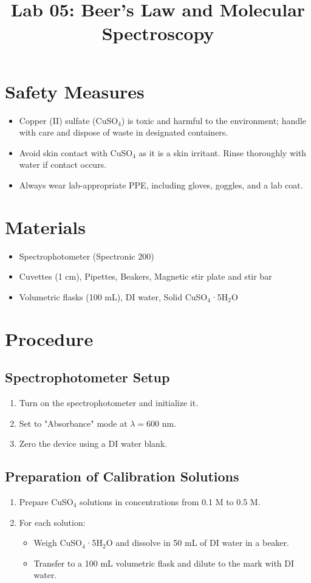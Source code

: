 \documentclass{article}
\title{Lab 05: Beer's Law and Molecular Spectroscopy}
\begin{document}
\section*{Safety Measures}
\begin{itemize}
    \item Copper (II) sulfate (CuSO$_4$) is toxic and harmful to the environment; handle with care and dispose of waste in designated containers.
    \item Avoid skin contact with CuSO$_4$ as it is a skin irritant. Rinse thoroughly with water if contact occurs.
    \item Always wear lab-appropriate PPE, including gloves, goggles, and a lab coat.
\end{itemize}

\section*{Materials}
\begin{itemize}
    \item Spectrophotometer (Spectronic 200)
    \item Cuvettes (1 cm), Pipettes, Beakers, Magnetic stir plate and stir bar
    \item Volumetric flasks (100 mL), DI water, Solid CuSO$_4$·5H$_2$O
\end{itemize}

\section*{Procedure}

\subsection*{Spectrophotometer Setup}
\begin{enumerate}
    \item Turn on the spectrophotometer and initialize it.
    \item Set to "Absorbance" mode at $\lambda = 600$ nm.
    \item Zero the device using a DI water blank.
\end{enumerate}

\subsection*{Preparation of Calibration Solutions}
\begin{enumerate}
    \item Prepare CuSO$_4$ solutions in concentrations from 0.1 M to 0.5 M.
    \item For each solution:
    \begin{itemize}
        \item Weigh CuSO$_4$·5H$_2$O and dissolve in 50 mL of DI water in a beaker.
        \item Transfer to a 100 mL volumetric flask and dilute to the mark with DI water.
    \end{itemize}
\end{enumerate}
\end{document}
